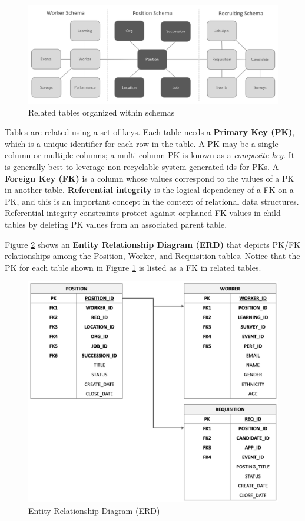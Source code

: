 \documentclass[
]{book}
\begin{document}
\begin{figure}

{\centering \includegraphics[width=1\linewidth]{graphics/dw_schema} 

}

\caption{Related tables organized within schemas}\label{fig:data-schemas}
\end{figure}

Tables are related using a set of keys. Each table needs a \textbf{Primary Key (PK)}, which is a unique identifier for each row in the table. A PK may be a single column or multiple columns; a multi-column PK is known as a \emph{composite key}. It is generally best to leverage non-recyclable system-generated ids for PKs. A \textbf{Foreign Key (FK)} is a column whose values correspond to the values of a PK in another table. \textbf{Referential integrity} is the logical dependency of a FK on a PK, and this is an important concept in the context of relational data structures. Referential integrity constraints protect against orphaned FK values in child tables by deleting PK values from an associated parent table.

Figure \ref{fig:erd} shows an \textbf{Entity Relationship Diagram (ERD)} that depicts PK/FK relationships among the Position, Worker, and Requisition tables. Notice that the PK for each table shown in Figure \ref{fig:data-schemas} is listed as a FK in related tables.

\begin{figure}

{\centering \includegraphics[width=0.75\linewidth]{graphics/dw_erd} 

}

\caption{Entity Relationship Diagram (ERD)}\label{fig:erd}
\end{figure}
\end{document}
